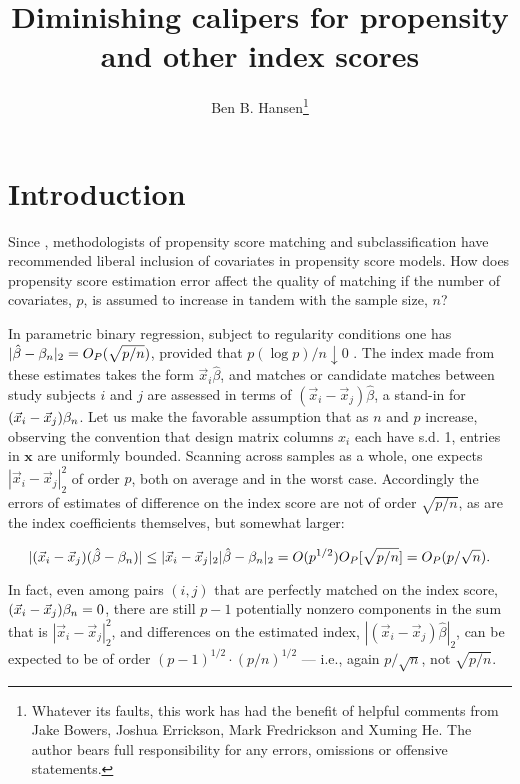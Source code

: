 \documentclass{article}
\author{Ben B. Hansen\thanks{Whatever its faults, this work has had the benefit of helpful comments from Jake Bowers, Joshua Errickson, Mark Fredrickson and Xuming He. The author bears full responsibility for any errors, omissions or offensive statements.}}
\title{Diminishing calipers for propensity and other index scores}
\theoremstyle{remark}
\begin{document}
\maketitle

\section{Introduction} \label{sec:introduction}
Since \citet{rubin:thom:1996}, methodologists of propensity score
matching and subclassification have recommended liberal inclusion of
covariates in propensity score models. How does propensity score
estimation error affect the quality of matching if the number of
covariates, $p$, is assumed to increase in tandem with the sample size,
$n$? 

In parametric binary regression, subject to regularity conditions one
has $|\hat\beta - \beta_{n }|_2 = O_{P}(\sqrt{p/n})$, provided that
$p(\log p)/n \downarrow 0$ \citep{he2000parameters}. The index made from
these estimates takes the form $\vec{x}_i \hat\beta$, and matches or
candidate matches between study subjects $i$ and $j$ are assessed in
terms of $(\vec{x}_i -\vec{x}_j)\hat\beta$, a stand-in for
$(\vec{x}_i - \vec{x}_j)\beta_{n }$. Let us make the favorable assumption
that as $n$ and $p$ increase, observing the convention that 
design matrix columns $x_{i}$ each have s.d. 1, entries in $\mathbf{x}$ are
uniformly bounded. Scanning across samples as
a whole, one expects $|\vec{x}_i - \vec{x}_j|_2^2$ of order $p$, both on
average and in the worst case. Accordingly the errors of estimates of
difference on the index score are not of order $\sqrt{p/n}$, as are the
index coefficients themselves, but somewhat larger:

\begin{equation*}
|(\vec{x}_i -\vec{x}_j)(\hat\beta - \beta_{n })| \leq |\vec{x}_i -\vec{x}_j|_2 |\hat\beta - \beta_{n }|_2 = O(p^{1/2})O_P[\sqrt{p/n}] = O_P(p/\sqrt{n}) . 
\end{equation*}

In fact, even among pairs $(i,j)$ that are perfectly matched on the index score,
$(\vec{x}_i - \vec{x}_j)\beta_{n } = 0$, there are still $p-1$ potentially nonzero
components in the sum that is $|\vec{x}_i - \vec{x}_j|_2^2$, and
differences on the estimated index,
$|(\vec{x}_i - \vec{x}_j)\hat\beta|_2$, can be expected to be of order
$(p-1)^{1/2} \cdot (p/n)^{1/2}$ --- i.e., again $p/\sqrt{n}$, not $\sqrt{p/n}$.
\end{document}
